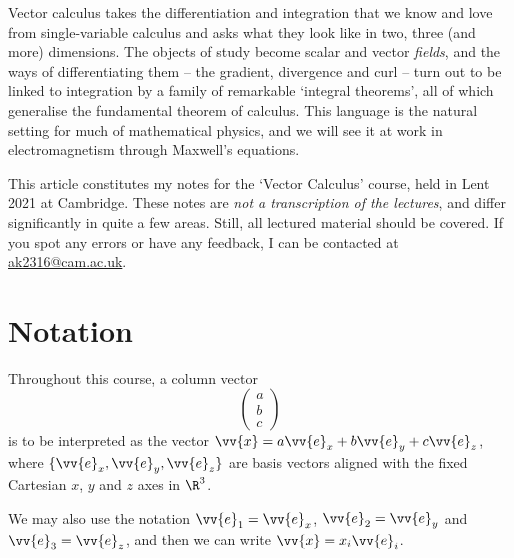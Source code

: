 



Vector calculus takes the differentiation and integration that we know and love from single-variable calculus and asks what they look like in two, three (and more) dimensions. The objects of study become scalar and vector \emph{fields}, and the ways of differentiating them -- the gradient, divergence and curl -- turn out to be linked to integration by a family of remarkable `integral theorems', all of which generalise the fundamental theorem of calculus. This language is the natural setting for much of mathematical physics, and we will see it at work in electromagnetism through Maxwell's equations.

This article constitutes my notes for the `Vector Calculus' course, held in Lent 2021 at Cambridge. These notes are \emph{not a transcription of the lectures}, and differ significantly in quite a few areas. Still, all lectured material should be covered. If you spot any errors or have any feedback, I can be contacted at \href{mailto:ak2316@cam.ac.uk}{ak2316@cam.ac.uk}.



\section{Notation}


Throughout this course, a column vector
$$
\begin{pmatrix}
a \\ b\\ c
\end{pmatrix}
$$
is to be interpreted as the vector $\vv{x} = a \vv{e}_x + b \vv{e}_y + c\vv{e}_z$, where $\{\vv{e}_x, \vv{e}_y, \vv{e}_z\}$ are basis vectors aligned with the fixed Cartesian $x$, $y$ and $z$ axes in $\R^3$.

\begin{center}
\end{center}

We may also use the notation $\vv{e}_1 = \vv{e}_x$, $\vv{e}_2 = \vv{e}_y$ and $\vv{e}_3 = \vv{e}_z$, and then we can write $\vv{x} = x_i \vv{e}_i$.

